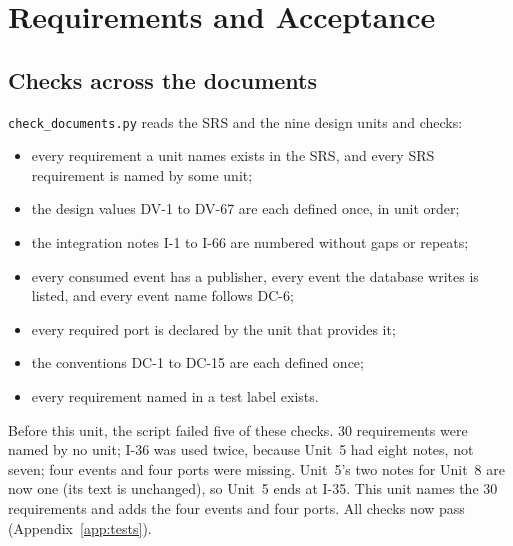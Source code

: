 \documentclass[11pt,a4paper]{article}
\begin{document}
\section{Requirements and Acceptance}
\label{sec:coverage}

\subsection{Checks across the documents}
\label{sec:doccheck}
\texttt{check\_\allowbreak documents.\allowbreak py} reads the SRS and the nine design units and checks:
\begin{itemize}[nosep]
  \item every requirement a unit names exists in the SRS, and every SRS requirement is named by some unit;
  \item the design values DV-1 to DV-67 are each defined once, in unit order;
  \item the integration notes I-1 to I-66 are numbered without gaps or repeats;
  \item every consumed event has a publisher, every event the database writes is listed, and every event name follows DC-6;
  \item every required port is declared by the unit that provides it;
  \item the conventions DC-1 to DC-15 are each defined once;
  \item every requirement named in a test label exists.
\end{itemize}
Before this unit, the script failed five of these checks. 30 requirements were named by no unit; I-36 was used twice, because Unit~5 had eight notes, not seven; four events and four ports were missing. Unit~5's two notes for Unit~8 are now one (its text is unchanged), so Unit~5 ends at I-35. This unit names the 30 requirements and adds the four events and four ports. All checks now pass (Appendix~\ref{app:tests}).
\end{document}
